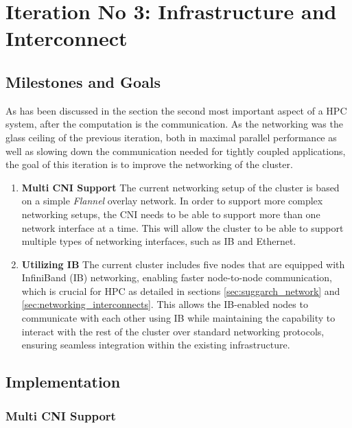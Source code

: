 \section{Iteration No 3: Infrastructure and Interconnect}
\label{sec:iteration_no3}

\subsection{Milestones and Goals}

As has been discussed in the section  the second most important
aspect of a \ac{HPC} system, after the computation is the communication.
As the networking was the glass ceiling of the previous iteration, both in maximal parallel performance
as well as slowing down the communication needed for tightly coupled applications,
the goal of this iteration is to improve the networking of the cluster.


\begin{enumerate}
    \item \textbf{Multi \ac{CNI} Support} The current networking setup of the cluster is based on a simple \textit{Flannel}
          overlay network. In order to support more complex networking setups, the \ac{CNI} needs to be able to support more than one network
          interface at a time. This will allow the cluster to be able to support multiple types of networking interfaces, such as \ac{IB} and Ethernet.
    \item \textbf{Utilizing \ac{IB}} The current cluster includes five nodes that are equipped with InfiniBand (\ac{IB}) networking,
          enabling faster node-to-node communication, which is crucial for \ac{HPC} as detailed in sections \ref{sec:suggarch_network} and \ref{sec:networking_interconnects}.
          This allows the \ac{IB}-enabled nodes to communicate with each other using \ac{IB} while maintaining the capability to interact with the rest
          of the cluster over standard networking protocols, ensuring seamless integration within the existing infrastructure.
\end{enumerate}
\subsection{Implementation}


\subsubsection{Multi \ac{CNI} Support}

